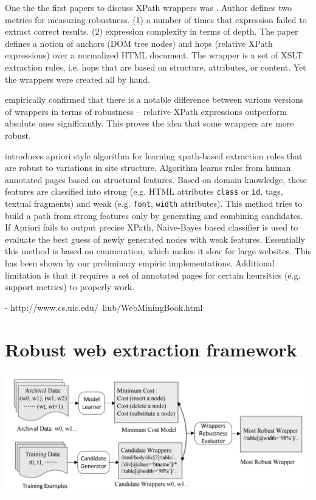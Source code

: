 One the the first papers to discuss XPath wrappers was \cite{Myllymaki02robustweb}. Author defines two metrics for measuring robustness. (1) a number of times that expression failed to extract correct results. (2) expression complexity in terms of depth. The paper defines a notion of anchors (DOM tree nodes) and hops (relative XPath expressions) over a normalized HTML document. The wrapper is a set of XSLT extraction rules, i.e. hops that are based on structure, attributes, or content. Yet the wrappers were created all by hand.

\cite{Kowalkiewicz:2006:RWC:1135777.1135928} empirically confirmed that there is a notable difference between various versions of wrappers in terms of robustness – relative XPath expressions outperform absolute ones significantly. This proves the idea that some wrappers are more robust.

\cite{DBLP:conf/icde/GulhaneMMRRSSTT11} introduces apriori style algorithm for learning xpath-based extraction rules that are robust to variations in site structure. Algorithm learns rules from human annotated pages based on structural features. Based on domain knowledge, these features are classified into strong (e.g. HTML attributes \texttt{class} or \texttt{id}, tags, textual fragments) and weak (e.g. \texttt{font}, \texttt{width} attributes). This method tries to build a path from strong features only by generating and combining candidates. If Apriori fails to output precise XPath, Naive-Bayes based classifier is used to evaluate the best guess of newly generated nodes with weak features. Essentially this method is based on enumeration, which makes it slow for large websites. This has been shown by our preliminary empiric implementations. Additional limitation is that it requires a set of annotated pages for certain heursitics (e.g. support metrics) to properly work. 

\cite{Thomsen:2012:WWS:2364120.2364156}

- http://www.cs.uic.edu/~liub/WebMiningBook.html\\


\section{Robust web extraction framework}

\includegraphics[width=\linewidth]{figures/robust-web-extraction-framework}


